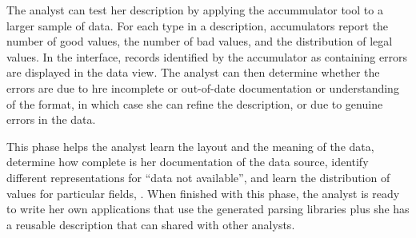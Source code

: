 The analyst can test her description by applying the accummulator tool
to a larger sample of data.  For each type in a \pads{} description,
accumulators report the number of good values, the number of bad
values, and the distribution of legal values.  In the \launchpads{}
interface, records identified by the accumulator as containing errors
are displayed in the data view.  The analyst can then determine
whether the errors are due to hre incomplete or out-of-date
documentation or understanding of the format, in which case she can
refine the description, or due to genuine errors in the data.  

This phase helps the analyst learn the layout and the meaning of the
data, determine how complete is her documentation of the data source,
identify different representations for ``data not available'', and
learn the distribution of values for particular fields, \etc{}.
When finished with this phase, the analyst is ready to write her own
applications that use the generated parsing libraries plus 
she has a reusable description that can shared with other analysts.

